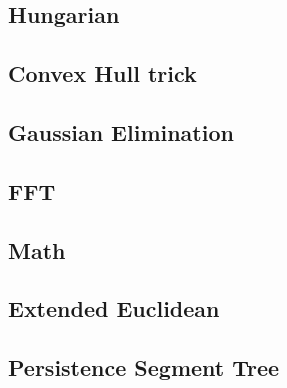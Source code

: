\documentclass[10pt,landscape,a4paper,twocolumn]{article}
\begin{document}
\subsection{Hungarian}


\subsection{Convex Hull trick}


\subsection{Gaussian Elimination}


\subsection{FFT}


\subsection{Math}


\subsection{Extended Euclidean}


\subsection{Persistence Segment Tree}

\end{document}
